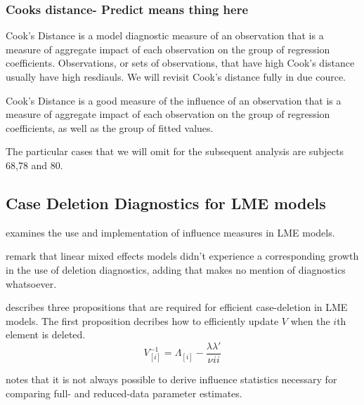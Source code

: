 \documentclass[12pt, a4paper]{report}
\theoremstyle{plain}
\theoremstyle{definition}
\theoremstyle{remark}
\begin{document}
	\subsubsection{Cooks distance- Predict means thing here}
	Cook's Distance is a model diagnostic measure of an observation that is a measure of aggregate impact of each observation on the group of regression coefficients. Observations, or sets of observations, that have high Cook's distance usually have high resdiauls. We will revisit Cook's distance fully in due cource.
	
	Cook's Distance is a good measure of the influence of an observation that is a measure of aggregate impact of each observation on the group of regression coefficients, as well as the group of fitted values.
	
	
	
	
	
	The particular cases that we will omit for the subsequent analysis are subjects 68,78 and 80.
	
	\subsection{Case Deletion Diagnostics for LME models}
	\citet{schabenberger} examines the use and implementation of
	influence measures in LME models.
	
	\citet{HaslettDillane} remark that linear mixed effects models
	didn't experience a corresponding growth in the use of deletion
	diagnostics, adding that \citet{McCullSearle} makes no mention of
	diagnostics whatsoever.

	
	\citet{Christensen} describes three propositions that are required
	for efficient case-deletion in LME models. The first proposition
	decribes how to efficiently update $V$ when the $i$th element is
	deleted.
	\begin{equation}
	V_{[i]}^{-1} = \Lambda_{[i]} - \frac{\lambda
		\lambda\prime}{\nu^{}ii}
	\end{equation}
	
	

	
	
	
	
	
	
	
	\citet{schabenberger} notes that it is not always possible to
	derive influence statistics necessary for comparing full- and
	reduced-data parameter estimates. 
	
\end{document}
